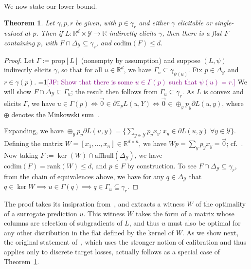 \documentclass{article}
\newcommand{\Comments}{1}
\newcommand{\mynote}[2]{\ifnum\Comments=1\textcolor{#1}{#2}\fi}
\newcommand{\jessie}[1]{\mynote{purple}{[JF: #1]}}
\newcommand{\reals}{\mathbb{R}}
\newcommand{\simplex}{\Delta_\Y}
\newcommand{\prop}[1]{\mathrm{prop}[#1]}
\newcommand{\codim}{\mathrm{codim}}
\newcommand{\rank}{\mathrm{rank}}
\newcommand{\affhull}{\mathrm{affhull}}
\newcommand{\E}{\mathbb{E}}
\newcommand{\R}{\mathcal{R}}
\newcommand{\Y}{\mathcal{Y}}
\newcommand{\exploss}[3]{\E_{#3} #1(#2,Y)}
\newtheorem{theorem}{Theorem}
\begin{document}
We now state our lower bound.

\begin{theorem}\label{thm:cvx-flats}
Let $\gamma, p, r$ be given, with $p \in \gamma_r$ and either $\gamma$ elicitable or single-valued at $p$. 
Then if $L: \reals^d \times \Y \to \reals$ indirectly elicits $\gamma$, then there is a flat $F$ containing $p$, with $F \cap \simplex \subseteq \gamma_r$, and $\codim(F) \leq d$.
\end{theorem}
\begin{proof}
	Let $\Gamma := \prop{L}$ (nonempty by assumption) and suppose $(L, \psi)$ indirectly elicits $\gamma$, so that for all $u \in \reals^d$, we have $\Gamma_u \subseteq \gamma_{\psi(u)}$.
	Fix $p \in \simplex$ and $r \in \gamma(p)$.
  \jessie{Show that there is some $u \in \Gamma(p)$ such that $\psi(u) = r$.}
	We will show $F \cap \simplex \subseteq \Gamma_u$; the result then follows from $\Gamma_u \subseteq \gamma_r$.
	As $L$ is convex and elicits $\Gamma$, we have $u \in \Gamma(p) \iff \vec 0 \in \partial \exploss{L}{u}{p} \iff \vec 0 \in \oplus_y p_y \partial L(u,y)$, where $\oplus$ denotes the Minkowski sum~\citep[Theorem 4.1.1]{hiriart2012fundamentals}.
	
	Expanding, we have $\oplus_y p_y \partial L(u,y) = \{ \sum_{y\in\Y} p_y x_y : x_y \in \partial L(u,y) \; \forall y\in\Y\}$.
	Defining the matrix $W = [x_1, \ldots, x_n] \in \reals^{d\times n}$, we have $W p = \sum_y p_y x_y = \vec 0$;
  cf.~\cite[$\mathbf{A}^m$ in Theorem 16]{ramaswamy2016convex}.
	Now taking $F := \ker(W) \cap \affhull(\simplex)$, we have $\codim(F) = \rank(W) \leq d$, and $p \in F$ by construction.
  To see $F \cap \simplex \subseteq \gamma_r$, from the chain of equivalences above, we have for any $q\in\simplex$ that $q \in \ker W \implies u \in \Gamma(q) \implies q \in \Gamma_u \subseteq \gamma_r$.
\end{proof}

The proof takes its insipration from~\citet[Theorem 16]{ramaswamy2016convex}, and extracts a witness $W$ of the optimality of a surrogate prediction $u$.
This witness $W$ takes the form of a matrix whose columns are selection of subgradients of $L$, and thus $u$ must also be optimal for any other distribution in the flat defined by the kernel of $W$.
As we show next, the original statement of~\citet[Theorem 16]{ramaswamy2016convex}, which uses the stronger notion of calibration and thus applies only to discrete target losses, actually follows as a special case of Theorem~\ref{thm:cvx-flats}.
\end{document}
